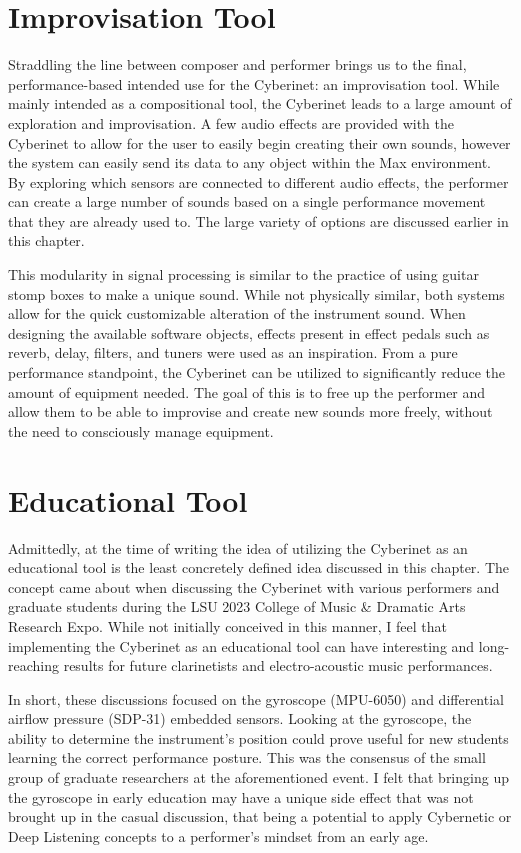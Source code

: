 \section{Improvisation Tool}
Straddling the line between composer and performer brings us to the final, performance-based intended use for the Cyberinet: an improvisation tool. While mainly intended as a compositional tool, the Cyberinet leads to a large amount of exploration and improvisation. A few audio effects are provided with the Cyberinet to allow for the user to easily begin creating their own sounds, however the system can easily send its data to any object within the Max environment. By exploring which sensors are connected to different audio effects, the performer can create a large number of sounds based on a single performance movement that they are already used to. The large variety of options are discussed earlier in this chapter.

This modularity in signal processing is similar to the practice of using guitar stomp boxes to make a unique sound. While not physically similar, both systems allow for the quick customizable alteration of the instrument sound. When designing the available software objects, effects present in effect pedals such as reverb, delay, filters, and tuners were used as an inspiration. From a pure performance standpoint, the Cyberinet can be utilized to significantly reduce the amount of equipment needed. The goal of this is to free up the performer and allow them to be able to improvise and create new sounds more freely, without the need to consciously manage equipment.

\section{Educational Tool}
Admittedly, at the time of writing the idea of utilizing the Cyberinet as an educational tool is the least concretely defined idea discussed in this chapter. The concept came about when discussing the Cyberinet with various performers and graduate students during the LSU 2023 College of Music \& Dramatic Arts Research Expo. While not initially conceived in this manner, I feel that implementing the Cyberinet as an educational tool can have interesting and long-reaching results for future clarinetists and electro-acoustic music performances. 

In short, these discussions focused on the gyroscope (MPU-6050) and differential airflow pressure (SDP-31) embedded sensors. Looking at the gyroscope, the ability to determine the instrument's position could prove useful for new students learning the correct performance posture. This was the consensus of the small group of graduate researchers at the aforementioned event. I felt that bringing up the gyroscope in early education may have a unique side effect that was not brought up in the casual discussion, that being a potential to apply Cybernetic or Deep Listening concepts to a performer's mindset from an early age.

